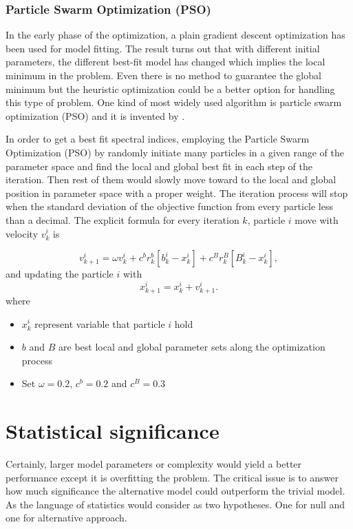 \subsubsection{Particle Swarm Optimization (PSO)}

In the early phase of the optimization, a plain gradient descent 
optimization has been used for model fitting. The result turns out 
that with different initial parameters, the different best-fit model 
has changed which implies the local minimum in the problem. 
Even there is no method to guarantee the global minimum but the heuristic
optimization could be a better option for handling this type of problem.
One kind of most widely used algorithm is particle swarm
optimization (PSO) and it is invented by \cite{pso_optimize}.

In order to get a best fit spectral indices, employing the Particle Swarm Optimization (PSO)
by randomly initiate many particles in a given range of the parameter space and find the
local and global best fit in each step of the iteration. Then rest of them would slowly move
toward to the local and global position in parameter space with a proper weight. 
The iteration process will stop when the standard deviation of the objective function from 
every particle less than a decimal. The explicit formula for every iteration $k$,
particle $i$ move with velocity $v_k^i$ is

\begin{equation}
    v^i_{k+1} = \omega v^i_k + c^br^b_k[b^i_k-x^i_k] + c^Br^B_k[B^i_k-x^i_k],
    \label{eq:pso}
\end{equation}
and updating the particle $i$ with
\begin{equation}
    x^i_{k+1} = x^i_k + v^i_{k+1}.
    \label{eq:pso_update}
\end{equation}
where
\begin{itemize}
    \item $x^i_k$ represent variable that particle $i$ hold
    \item $b$ and $B$ are best local and global parameter sets along the optimization process
    \item Set $\omega = 0.2$, $c^b = 0.2$ and $c^B = 0.3$
\end{itemize}

\section{Statistical significance}

Certainly, larger model parameters or complexity would yield 
a better performance except it is overfitting the problem.
The critical issue is to answer how much significance the alternative 
model could outperform the trivial model. As the language of statistics 
would consider as two hypotheses. One for null and one for alternative 
approach. 

